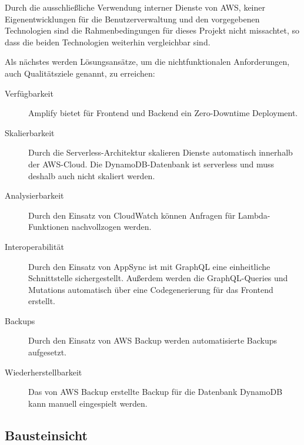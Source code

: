 Durch die ausschließliche Verwendung interner Dienste von \ac{AWS}, keiner Eigenentwicklungen für die Benutzerverwaltung und den vorgegebenen Technologien sind die Rahmenbedingungen für dieses Projekt nicht missachtet, so dass die beiden Technologien weiterhin vergleichbar sind.

Als nächstes werden Lösungsansätze, um die nichtfunktionalen Anforderungen, auch Qualitätsziele genannt, zu erreichen:

\begin{description}
   \item[Verfügbarkeit] Amplify bietet für Frontend und Backend ein Zero-Downtime Deployment.
   \item[Skalierbarkeit] Durch die Serverless-Architektur skalieren Dienste automatisch innerhalb der \ac{AWS}-Cloud. Die DynamoDB-Datenbank ist serverless und muss deshalb auch nicht skaliert werden.
   \item[Analysierbarkeit] Durch den Einsatz von CloudWatch können Anfragen für Lambda-Funktionen nachvollzogen werden.
   \item[Interoperabilität] Durch den Einsatz von AppSync ist mit GraphQL eine einheitliche Schnittstelle sichergestellt. Außerdem werden die GraphQL-Queries und Mutations automatisch über eine Codegenerierung für das Frontend erstellt.
   \item[Backups] Durch den Einsatz von AWS Backup werden automatisierte Backups aufgesetzt.
   \item[Wiederherstellbarkeit] Das von AWS Backup erstellte Backup für die Datenbank DynamoDB kann manuell eingespielt werden.
\end{description}

\subsection{Bausteinsicht}

